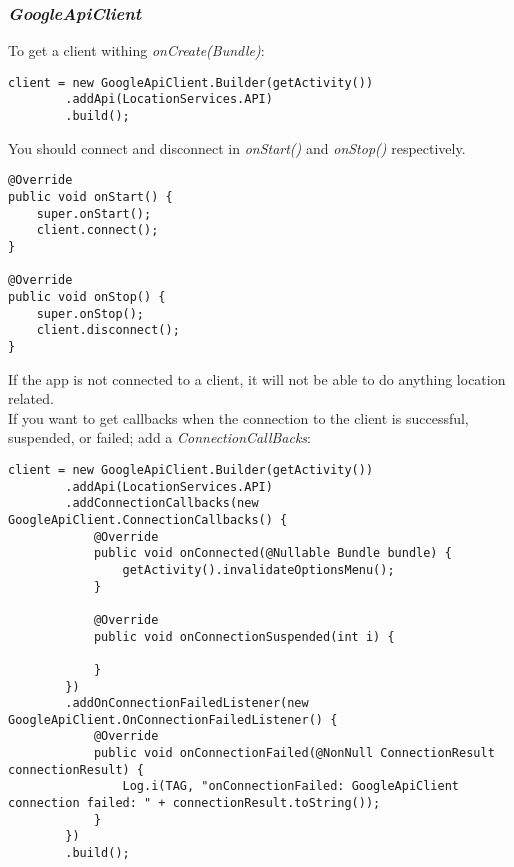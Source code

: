 \documentclass[]{article}
\renewcommand{\it}[1]{\textit{#1}}
\begin{document}
\subsubsection{\it{GoogleApiClient}}
To get a client withing \it{onCreate(Bundle)}:
\begin{lstlisting}
client = new GoogleApiClient.Builder(getActivity())
		.addApi(LocationServices.API)
		.build();
\end{lstlisting}
You should connect and disconnect in \it{onStart()} and \it{onStop()} respectively.
\begin{lstlisting}
@Override
public void onStart() {
	super.onStart();
	client.connect();
}

@Override
public void onStop() {
	super.onStop();	
	client.disconnect();
}
\end{lstlisting}
If the app is not connected to a client, it will not be able to do anything location related.
\\
If you want to get callbacks when the connection to the client is successful, suspended, or failed; add a \it{ConnectionCallBacks}:
\begin{lstlisting}
client = new GoogleApiClient.Builder(getActivity())
		.addApi(LocationServices.API)
		.addConnectionCallbacks(new GoogleApiClient.ConnectionCallbacks() {
			@Override
			public void onConnected(@Nullable Bundle bundle) {
				getActivity().invalidateOptionsMenu();
			}
			
			@Override
			public void onConnectionSuspended(int i) {
				
			}
		})
		.addOnConnectionFailedListener(new GoogleApiClient.OnConnectionFailedListener() {
			@Override
			public void onConnectionFailed(@NonNull ConnectionResult connectionResult) {
				Log.i(TAG, "onConnectionFailed: GoogleApiClient connection failed: " + connectionResult.toString());
			}
		})
		.build();
\end{lstlisting}
\end{document}
